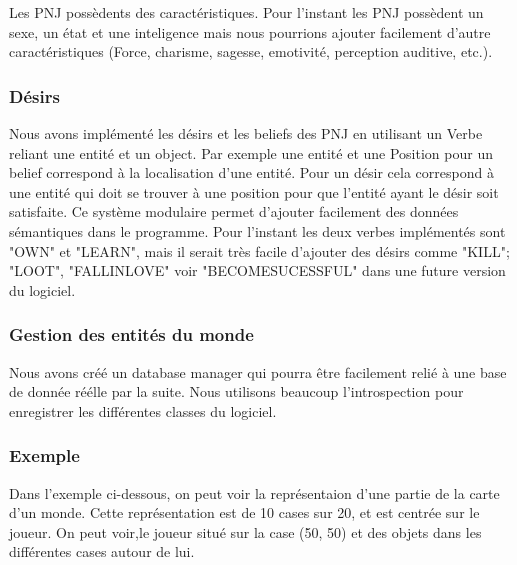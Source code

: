 \documentclass[asi]{picINSA}
\begin{document}
Les PNJ possèdents des caractéristiques. Pour l'instant les PNJ possèdent un sexe, un état et une inteligence mais nous pourrions ajouter facilement d'autre caractéristiques (Force, charisme, sagesse, emotivité, perception auditive, etc.).

\subsubsection{Désirs}

Nous avons implémenté les désirs et les beliefs des PNJ en utilisant un Verbe reliant une entité et un object. Par exemple une entité et une Position pour un belief correspond à la localisation d'une entité. Pour un désir cela correspond à une entité qui doit se trouver à une position pour que l'entité ayant le désir soit satisfaite. Ce système modulaire permet d'ajouter facilement des données sémantiques dans le programme. Pour l'instant les deux verbes implémentés sont "OWN" et "LEARN", mais il serait très facile d'ajouter des désirs comme "KILL"; "LOOT", "FALLINLOVE" voir "BECOMESUCESSFUL" dans une future version du logiciel.

\subsubsection{Gestion des entités du monde}

Nous avons créé un database manager qui pourra être facilement relié à une base de donnée réélle par la suite. Nous utilisons beaucoup l'introspection pour enregistrer les différentes classes du logiciel.

\subsubsection{Exemple}
Dans l'exemple ci-dessous, on peut voir la représentaion d'une partie de la carte d'un monde. Cette représentation est de 10 cases sur 20, et est centrée sur le joueur. On peut voir,le joueur situé sur la case (50, 50) et des objets dans les différentes cases autour de lui.
\end{document}
